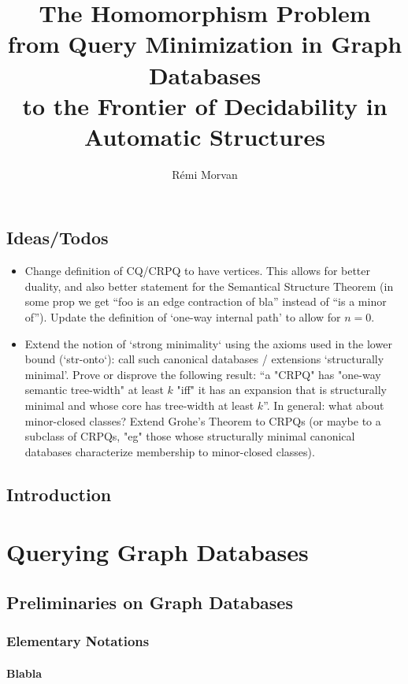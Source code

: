 \documentclass[a4paper,sfsidenotes,twoside,justified,nobib]{tufte-book-custom}
\title[The Homomorphism Problem]{The Homomorphism Problem\\from Query Minimization in Graph Databases\\ to the Frontier of Decidability in Automatic Structures}
\author{Rémi Morvan}
\begin{document}
\frontmatter




\mainmatter
\chapter{Ideas/Todos}

\begin{itemize}
	\item Change definition of CQ/CRPQ to have vertices. This allows for better duality,
		and also better statement for the Semantical Structure Theorem (in some prop we get
		``foo is an edge contraction of bla'' instead of ``is a minor of'').
		Update the definition of `one-way internal path' to allow for $n=0$.
	\item Extend the notion of `strong minimality` using the axioms used in the lower bound (`str-onto`): call such canonical databases / extensions `structurally minimal'.
	Prove or disprove the following result: ``a "CRPQ" has "one-way semantic tree-width" at least $k$ "iff" it has an expansion that is structurally minimal and whose core has tree-width at least $k$''. In general: what about minor-closed classes?
	Extend Grohe's Theorem to CRPQs (or maybe to a subclass of CRPQs, "eg" those whose
	structurally minimal canonical databases characterize membership to minor-closed classes).
\end{itemize}

\lipsum[1-4]

\chapter{Introduction}

\part{Querying Graph Databases}

\chapter{Preliminaries on Graph Databases}

\section{Elementary Notations}

\subsection{Blabla}
\end{document}
